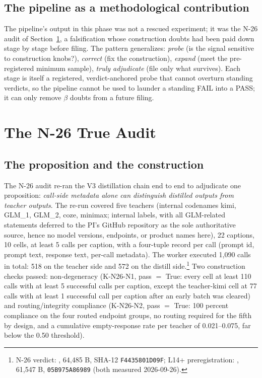 \documentclass[11pt]{article}
\newcommand{\sha}[1]{\texttt{#1}}
\begin{document}
\subsection{The pipeline as a methodological contribution}

The pipeline's output in this phase was not a rescued experiment; it was the N-26 audit of Section~\ref{sec:n26}, a falsification whose construction doubts had been paid down stage by stage before filing. The pattern generalizes: \emph{probe} (is the signal sensitive to construction knobs?), \emph{correct} (fix the construction), \emph{expand} (meet the pre-registered minimum sample), \emph{truly adjudicate} (file only what survives). Each stage is itself a registered, verdict-anchored probe that cannot overturn standing verdicts, so the pipeline cannot be used to launder a standing FAIL into a PASS; it can only remove $\beta$ doubts from a future filing.

\section{The N-26 True Audit}\label{sec:n26}

\subsection{The proposition and the construction}

The N-26 audit re-ran the V3 distillation chain end to end to adjudicate one proposition: \emph{call-side metadata alone can distinguish distilled outputs from teacher outputs}. The re-run covered five teachers (internal codenames kimi, GLM\_1, GLM\_2, coze, minimax; internal labels, with all GLM-related statements deferred to the PI's GitHub repository as the sole authoritative source, hence no model versions, endpoints, or product names here), 22 captions, 10 cells, at least 5 calls per caption, with a four-tuple record per call (prompt id, prompt text, response text, per-call metadata). The worker executed 1{,}090 calls in total: 518 on the teacher side and 572 on the distill side.\footnote{N-26 verdict: , 64{,}485 B, SHA-12 \sha{F4435801D09F}; L14+ preregistration: , 61{,}547 B, \sha{05B975A86989} (both measured 2026-09-26).} Two construction checks passed: non-degeneracy (K-N26-N1, pass $=$ True: every cell at least 110 calls with at least 5 successful calls per caption, except the teacher-kimi cell at 77 calls with at least 1 successful call per caption after an early batch was cleared) and routing/integrity compliance (K-N26-N2, pass $=$ True: 100 percent compliance on the four routed endpoint groups, no routing required for the fifth by design, and a cumulative empty-response rate per teacher of 0.021--0.075, far below the 0.50 threshold).
\end{document}
